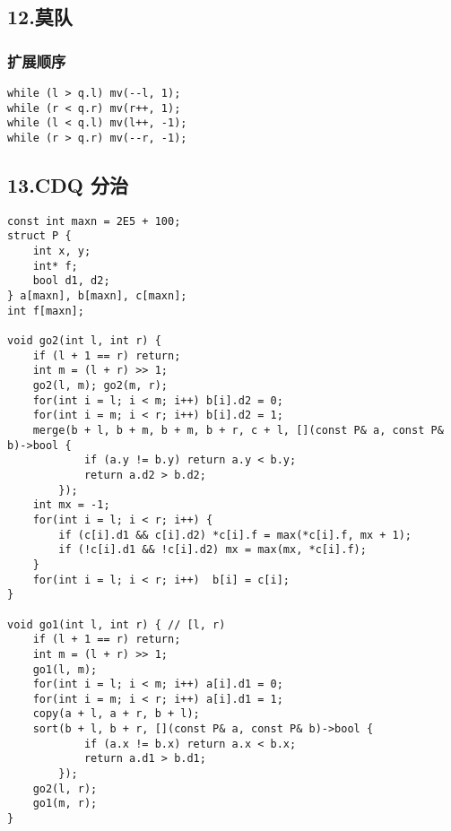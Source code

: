 \documentclass[]{article}
\begin{document}
\hypertarget{section}{%
\subsection{}\label{section}}

\hypertarget{ux83abux961f}{%
\subsection{12.莫队}\label{ux83abux961f}}

\hypertarget{ux6269ux5c55ux987aux5e8f}{%
\subsubsection{扩展顺序}\label{ux6269ux5c55ux987aux5e8f}}

\begin{verbatim}
while (l > q.l) mv(--l, 1);
while (r < q.r) mv(r++, 1);
while (l < q.l) mv(l++, -1);
while (r > q.r) mv(--r, -1);
\end{verbatim}

\hypertarget{cdq-ux5206ux6cbb}{%
\subsection{13.CDQ 分治}\label{cdq-ux5206ux6cbb}}

\begin{verbatim}
const int maxn = 2E5 + 100;
struct P {
    int x, y;
    int* f;
    bool d1, d2;
} a[maxn], b[maxn], c[maxn];
int f[maxn];

void go2(int l, int r) {
    if (l + 1 == r) return;
    int m = (l + r) >> 1;
    go2(l, m); go2(m, r);
    for(int i = l; i < m; i++) b[i].d2 = 0;
    for(int i = m; i < r; i++) b[i].d2 = 1;
    merge(b + l, b + m, b + m, b + r, c + l, [](const P& a, const P& b)->bool {
            if (a.y != b.y) return a.y < b.y;
            return a.d2 > b.d2;
        });
    int mx = -1;
    for(int i = l; i < r; i++) {
        if (c[i].d1 && c[i].d2) *c[i].f = max(*c[i].f, mx + 1);
        if (!c[i].d1 && !c[i].d2) mx = max(mx, *c[i].f);
    }
    for(int i = l; i < r; i++)  b[i] = c[i];
}

void go1(int l, int r) { // [l, r)
    if (l + 1 == r) return;
    int m = (l + r) >> 1;
    go1(l, m);
    for(int i = l; i < m; i++) a[i].d1 = 0;
    for(int i = m; i < r; i++) a[i].d1 = 1;
    copy(a + l, a + r, b + l);
    sort(b + l, b + r, [](const P& a, const P& b)->bool {
            if (a.x != b.x) return a.x < b.x;
            return a.d1 > b.d1;
        });
    go2(l, r);
    go1(m, r);
}

\end{verbatim}
\end{document}
